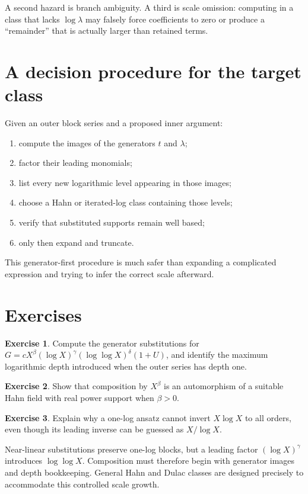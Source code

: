 \documentclass[11pt,openany]{book}
\theoremstyle{definition}
\newtheorem{exercise}{Exercise}[chapter]
\theoremstyle{plain}
\theoremstyle{remark}
\begin{document}
A second hazard is branch ambiguity. A third is scale omission: computing in a class that lacks \(\log\lambda\) may falsely force coefficients to zero or produce a ``remainder'' that is actually larger than retained terms.

\section{A decision procedure for the target class}
Given an outer block series and a proposed inner argument:
\begin{enumerate}
\item compute the images of the generators \(t\) and \(\lambda\);
\item factor their leading monomials;
\item list every new logarithmic level appearing in those images;
\item choose a Hahn or iterated-log class containing those levels;
\item verify that substituted supports remain well based;
\item only then expand and truncate.
\end{enumerate}
This generator-first procedure is much safer than expanding a complicated expression and trying to infer the correct scale afterward.

\section{Exercises}
\begin{exercise}
Compute the generator substitutions for \(G=cX^\beta(\log X)^\gamma(\log\log X)^\delta(1+U)\), and identify the maximum logarithmic depth introduced when the outer series has depth one.
\end{exercise}
\begin{exercise}
Show that composition by \(X^\beta\) is an automorphism of a suitable Hahn field with real power support when \(\beta>0\).
\end{exercise}
\begin{exercise}
Explain why a one-log ansatz cannot invert \(X\log X\) to all orders, even though its leading inverse can be guessed as \(X/\log X\).
\end{exercise}

\begin{summarybox}
Near-linear substitutions preserve one-log blocks, but a leading factor \((\log X)^\gamma\) introduces \(\log\log X\). Composition must therefore begin with generator images and depth bookkeeping. General Hahn and Dulac classes are designed precisely to accommodate this controlled scale growth.
\end{summarybox}
\end{document}

